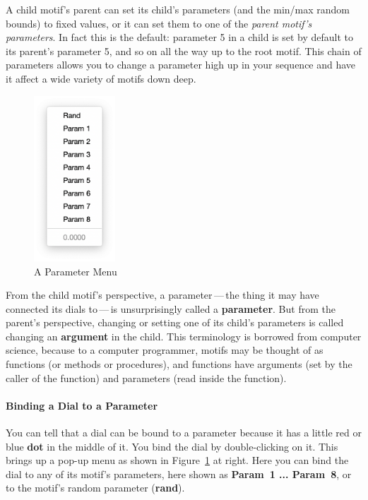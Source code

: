 \documentclass[twoside,10pt]{article}
\begin{document}
A child motif's parent can set its child's parameters (and the min/max random bounds) to fixed values, or it can set them to one of the {\it parent motif's parameters}.  In fact this is the default: parameter 5 in a child is set by default to its parent's parameter 5, and so on all the way up to the root motif.  This chain of parameters allows you to change a parameter high up in your sequence and have it affect a wide variety of motifs down deep.

\begin{figure}
\vspace{-1em}
\includegraphics[width=1.2in]{params}
\vspace{-2em}
\caption{A Parameter Menu}
\label{params}
\vspace{-3em}
\end{figure}

From the child motif's perspective, a parameter\,---\,the thing it may have connected its dials to\,---\,is unsurprisingly called a {\bf parameter}.  But from the parent's perspective, changing or setting one of its child's parameters is called changing an {\bf argument} in the child.  This terminology is borrowed from computer science, because to a computer programmer, motifs may be thought of as functions (or methods or procedures), and functions have arguments (set by the caller of the function) and parameters (read inside the function).

\paragraph{Binding a Dial to a Parameter} You can tell that a dial can be bound to a parameter because it has a little red or blue {\bf dot} in the middle of it.  You bind the dial by double-clicking on it.  This brings up a pop-up menu as shown in Figure~\ref{params} at right.  Here you can bind the dial to any of its motif's parameters, here shown as {\bf Param~1 ... Param~8}, or to the motif's random parameter ({\bf rand}).
\end{document}
